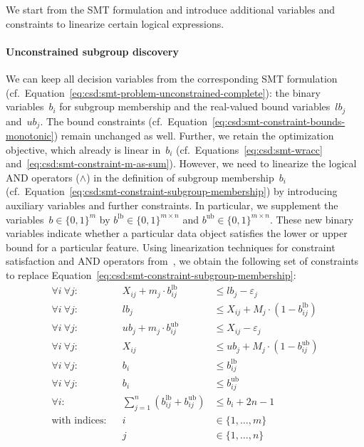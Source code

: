 \documentclass{article}
\theoremstyle{definition}
\begin{document}
We start from the SMT formulation and introduce additional variables and constraints to linearize certain logical expressions.

\paragraph{Unconstrained subgroup discovery}

We can keep all decision variables from the corresponding SMT formulation (cf.~Equation~\ref{eq:csd:smt-problem-unconstrained-complete}):
the binary variables~$b_i$ for subgroup membership and the real-valued bound variables~$\mathit{lb}_j$ and~$\mathit{ub}_j$.
The bound constraints (cf.~Equation~\ref{eq:csd:smt-constraint-bounds-monotonic}) remain unchanged as well.
Further, we retain the optimization objective, which already is linear in~$b_i$ (cf.~Equations~\ref{eq:csd:smt-wracc} and~\ref{eq:csd:smt-constraint-m-as-sum}).
However, we need to linearize the logical AND operators ($\land$) in the definition of subgroup membership~$b_i$ (cf.~Equation~\ref{eq:csd:smt-constraint-subgroup-membership}) by introducing auxiliary variables and further constraints.
In particular, we supplement the variables~$b \in \{0, 1\}^m$ by $b^{\text{lb}} \in \{0, 1\}^{m \times n}$ and $b^{\text{ub}} \in \{0, 1\}^{m \times n}$.
These new binary variables indicate whether a particular data object satisfies the lower or upper bound for a particular feature.
Using linearization techniques for constraint satisfaction and AND operators from~\cite{mosek2022modeling}, we obtain the following set of constraints to replace Equation~\ref{eq:csd:smt-constraint-subgroup-membership}:
%
\begin{equation}
	\begin{aligned}
		\forall i~\forall j: & & X_{ij} + m_j \cdot b^{\text{lb}}_{ij} &\leq \mathit{lb}_j - \varepsilon_j \\
	 	\forall i~\forall j: & & \mathit{lb}_j &\leq X_{ij} + M_j \cdot \left(1 - b^{\text{lb}}_{ij} \right) \\
	 	\forall i~\forall j: & & \mathit{ub}_j + m_j \cdot b^{\text{ub}}_{ij} &\leq X_{ij} - \varepsilon_j \\
	 	\forall i~\forall j: & & X_{ij} &\leq \mathit{ub}_j + M_j \cdot \left(1 - b^{\text{ub}}_{ij} \right) \\
	 	\forall i~\forall j: & & b_i &\leq b^{\text{lb}}_{ij} \\
	 	\forall i~\forall j: & & b_i &\leq b^{\text{ub}}_{ij} \\
	 	\forall i: & & \sum_{j=1}^{n} \left( b^{\text{lb}}_{ij} + b^{\text{ub}}_{ij} \right) &\leq b_i + 2n - 1 \\
		\text{with indices:} & & i &\in \{1, \dots, m\} \\
		& & j &\in \{1, \dots, n\}
	\end{aligned}
	\label{eq:csd:milp-constraint-subgroup-membership}
\end{equation}
\end{document}
